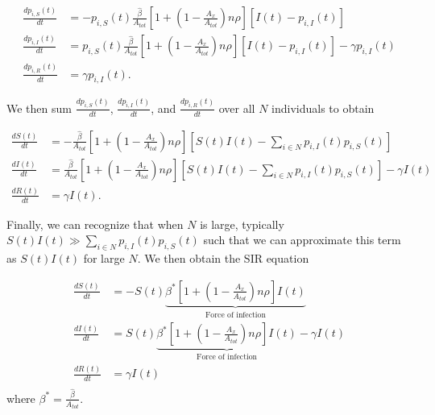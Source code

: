 \documentclass[11pt]{article}
\begin{document}
\begin{equation}
    \begin{aligned}
        \frac{d p_{i, S}(t)}{dt} &= -p_{i, S}(t) \frac{\hat{\beta}}{A_{tot}} \left[1 + (1 - \frac{A_x}{A_{tot}}) n \rho \right] [I(t) - p_{i, I}(t)] \\
        \frac{d p_{i, I}(t)}{dt} &= p_{i, S}(t) \frac{\hat{\beta}}{A_{tot}} \left[1 + (1 - \frac{A_x}{A_{tot}}) n \rho \right] [I(t) - p_{i, I}(t)] - \gamma p_{i, I}(t) \\
        \frac{d p_{i, R}(t)}{dt} &= \gamma p_{i, I}(t).
    \end{aligned}
    \label{eq:sir_individual_simplified}
\end{equation}

We then sum $\frac{d p_{i, S}(t)}{dt}$, $\frac{d p_{i, I}(t)}{dt}$, and $\frac{d p_{i, R}(t)}{dt}$ over all $N$ individuals to obtain

\begin{equation}
    \begin{aligned}
        \frac{d S(t)}{dt} &= -\frac{\hat{\beta}}{A_{tot}} \left[1 + (1 - \frac{A_x}{A_{tot}}) n \rho \right] [S(t)I(t) - \sum_{i \in N} p_{i, I}(t) p_{i, S}(t)] \\
        \frac{d I(t)}{dt} &= \frac{\hat{\beta}}{A_{tot}} \left[1 + (1 - \frac{A_x}{A_{tot}}) n \rho \right] [S(t)I(t) - \sum_{i \in N} p_{i, I}(t) p_{i, S}(t)] - \gamma I(t) \\
        \frac{d R(t)}{dt} &= \gamma I(t).
    \end{aligned}
    \label{eq:sir_population_full}
\end{equation}

Finally, we can recognize that when $N$ is large, typically $S(t)I(t) \gg \sum_{i \in N} p_{i, I}(t) p_{i, S}(t)$ such that we can approximate this term as $S(t)I(t)$ for large $N$. We then obtain the SIR equation 

\begin{equation}
    \begin{aligned}
        \frac{d S(t)}{dt} &= - S(t) \underbrace{\beta^* [1 + (1 - \frac{A_x}{A_{tot}})n\rho] I(t)}_{\text{Force of infection}}  \\
        \frac{d I(t)}{dt} &=  S(t) \underbrace{\beta^* [1 + (1 - \frac{A_x}{A_{tot}})n\rho] I(t)}_{\text{Force of infection}} - \gamma I(t) \\
        \frac{d R(t)}{dt} &= \gamma I(t) \\
    \end{aligned}
    \label{eq:sir_with_corr}
\end{equation}
where $\beta^* = \frac{\hat{\beta}}{A_{tot}}$.
\end{document}

